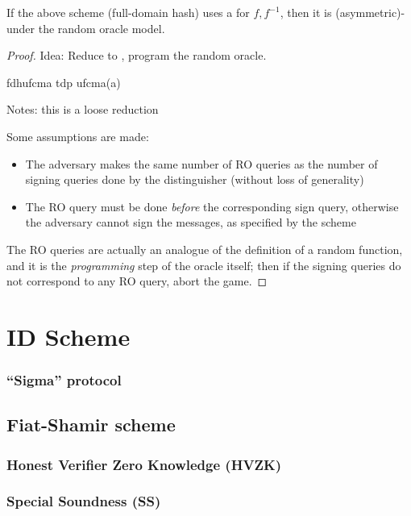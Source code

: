 \begin{theorem}
    If the above scheme (full-domain hash) uses a \tdp{} for $f, f^{-1}$, then it is (asymmetric)-\ufcma under the random oracle model.
\end{theorem}

\begin{proof}
    Idea: Reduce to \tdp, program the random oracle.

    \begin{cryptoredux}
        {fdhufcma}
        {}
        {tdp}
        {ufcma(a)}



        \cseqdelay
        \cseqbeginloop
        \invoke{}{$\sigma$}{}
        \cseqendloop
        \cseqdelay


        \send{}{$\sigma^*$}{}
    \end{cryptoredux}

    Notes: this is a loose reduction

    Some assumptions are made:

    \begin{itemize}
        \item The adversary makes the same number of RO queries as the number of signing queries done by the distinguisher (without loss of generality)
        \item The RO query must be done \emph{before} the corresponding sign query, otherwise the adversary cannot sign the messages, as specified by the scheme
    \end{itemize}

    The RO queries are actually an analogue of the definition of a random function, and it is the \emph{programming} step of the oracle itself; then if the signing queries do not correspond to any RO query, abort the game.

\end{proof}

\section{ID Scheme}

\subsubsection{``Sigma'' protocol}

\subsection{Fiat-Shamir scheme}

\subsubsection{Honest Verifier Zero Knowledge (HVZK)}

\subsubsection{Special Soundness (SS)}
